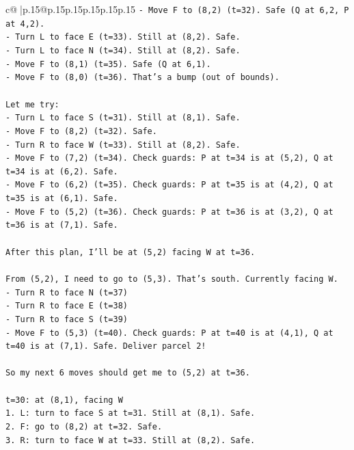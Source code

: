 \documentclass{article}
\begin{document}
{\begin{supertabular}{c@{$\;$}|p{.15\linewidth}@{}p{.15\linewidth}p{.15\linewidth}p{.15\linewidth}p{.15\linewidth}p{.15\linewidth}}
{{{\texttt{{-} Move F to (8,2) (t=32). Safe (Q at 6,2, P at 4,2).} \\
\texttt{{-} Turn L to face E (t=33). Still at (8,2). Safe.} \\
\texttt{{-} Turn L to face N (t=34). Still at (8,2). Safe.} \\
\texttt{{-} Move F to (8,1) (t=35). Safe (Q at 6,1).} \\
\texttt{{-} Move F to (8,0) (t=36). That's a bump (out of bounds).} \\
\\ 
\texttt{Let me try:} \\
\texttt{{-} Turn L to face S (t=31). Still at (8,1). Safe.} \\
\texttt{{-} Move F to (8,2) (t=32). Safe.} \\
\texttt{{-} Turn R to face W (t=33). Still at (8,2). Safe.} \\
\texttt{{-} Move F to (7,2) (t=34). Check guards: P at t=34 is at (5,2), Q at t=34 is at (6,2). Safe.} \\
\texttt{{-} Move F to (6,2) (t=35). Check guards: P at t=35 is at (4,2), Q at t=35 is at (6,1). Safe.} \\
\texttt{{-} Move F to (5,2) (t=36). Check guards: P at t=36 is at (3,2), Q at t=36 is at (7,1). Safe.} \\
\\ 
\texttt{After this plan, I'll be at (5,2) facing W at t=36.} \\
\\ 
\texttt{From (5,2), I need to go to (5,3). That's south. Currently facing W.} \\
\texttt{{-} Turn R to face N (t=37)} \\
\texttt{{-} Turn R to face E (t=38)} \\
\texttt{{-} Turn R to face S (t=39)} \\
\texttt{{-} Move F to (5,3) (t=40). Check guards: P at t=40 is at (4,1), Q at t=40 is at (7,1). Safe. Deliver parcel 2!} \\
\\ 
\texttt{So my next 6 moves should get me to (5,2) at t=36.} \\
\\ 
\texttt{t=30: at (8,1), facing W} \\
\texttt{1. L: turn to face S at t=31. Still at (8,1). Safe.} \\
\texttt{2. F: go to (8,2) at t=32. Safe.} \\
\texttt{3. R: turn to face W at t=33. Still at (8,2). Safe.} \\
}}}
\end{supertabular}}
\end{document}
